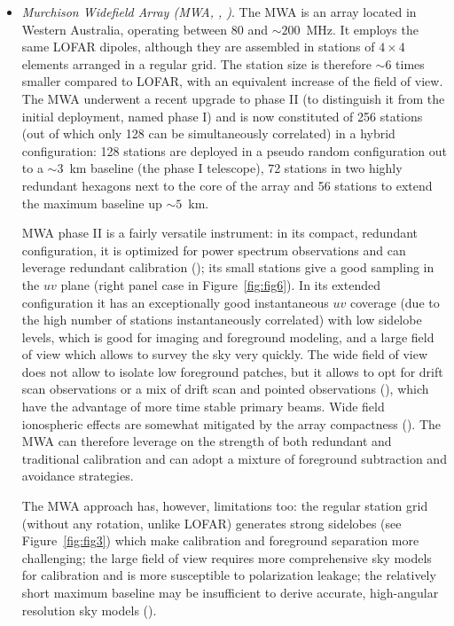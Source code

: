 {\begin{itemize}
The LOFAR design is suited for 21~cm tomography on large angular scales, providing foregrounds are adequately subtracted (\cite{zaroubi12}).

\item {\it Murchison Widefield Array (MWA, \cite{tingay13}, \cite{wayth18})}. The MWA is an array located in Western Australia, operating between 80 and $\sim 200$~MHz. It employs the same LOFAR dipoles, although they are assembled in stations of $4 \times 4$ elements arranged in a regular grid. The station size is therefore $\sim 6$ times smaller compared to LOFAR, with an equivalent increase of the field of view. 
The MWA underwent a recent upgrade to phase II (to distinguish it from the initial deployment, named phase I) and is now constituted of 256 stations (out of which only 128 can be simultaneously correlated) in a hybrid configuration: 128 stations are deployed in a pseudo random configuration out to a $\sim 3$~km baseline (the phase I telescope), 72 stations in two highly redundant hexagons next to the core of the array and 56 stations to extend the maximum baseline up $\sim 5$~km. 

MWA phase II is a fairly versatile instrument: in its compact, redundant configuration, it is optimized for power spectrum observations and can leverage redundant calibration (\cite{li18}); its small stations give a good sampling in the $uv$ plane (right panel case in Figure~\ref{fig:fig6}). In its extended configuration it has an exceptionally good instantaneous $uv$ coverage (due to the high number of stations instantaneously correlated) with low sidelobe levels, which is good for imaging and foreground modeling, and a large field of view which allows to survey the sky very quickly. The wide field of view does not allow to isolate low foreground patches, but it allows to opt for drift scan observations or a mix of drift scan and pointed observations (\cite{trott14}), which have the advantage of more time stable primary beams. Wide field ionospheric effects are somewhat mitigated by the array compactness (\cite{jordan17}).
The MWA can therefore leverage on the strength of both redundant and traditional calibration and can adopt a mixture of foreground subtraction and avoidance strategies.

The MWA approach has, however, limitations too: the regular station grid (without any rotation, unlike LOFAR) generates strong sidelobes (see Figure~\ref{fig:fig3}) which make calibration and foreground separation more challenging; the large field of view requires more comprehensive sky models for calibration and is more susceptible to polarization leakage; the relatively short maximum baseline may be insufficient to derive accurate, high-angular resolution sky models (\cite{procopio17}). 


\end{itemize}}
